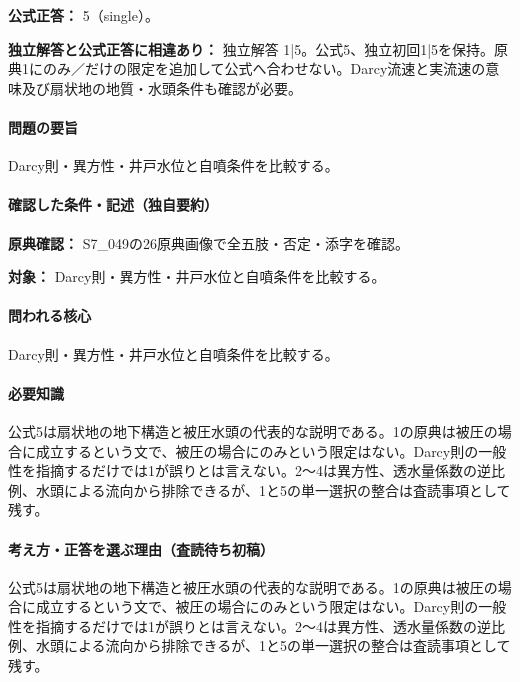 \textbf{公式正答：} 5（single）。

\par\textbf{独立解答と公式正答に相違あり：} 独立解答 1|5。公式5、独立初回1|5を保持。原典1にのみ／だけの限定を追加して公式へ合わせない。Darcy流速と実流速の意味及び扇状地の地質・水頭条件も確認が必要。

\paragraph{問題の要旨} Darcy則・異方性・井戸水位と自噴条件を比較する。

\paragraph{確認した条件・記述（独自要約）}\mbox{}\par

\noindent\textbf{原典確認：} S7\_049の26原典画像で全五肢・否定・添字を確認。\par

\noindent\textbf{対象：} Darcy則・異方性・井戸水位と自噴条件を比較する。\par

\paragraph{問われる核心} Darcy則・異方性・井戸水位と自噴条件を比較する。

\paragraph{必要知識} 公式5は扇状地の地下構造と被圧水頭の代表的な説明である。1の原典は被圧の場合に成立するという文で、被圧の場合にのみという限定はない。Darcy則の一般性を指摘するだけでは1が誤りとは言えない。2～4は異方性、透水量係数の逆比例、水頭による流向から排除できるが、1と5の単一選択の整合は査読事項として残す。

\paragraph{考え方・正答を選ぶ理由（査読待ち初稿）} 公式5は扇状地の地下構造と被圧水頭の代表的な説明である。1の原典は被圧の場合に成立するという文で、被圧の場合にのみという限定はない。Darcy則の一般性を指摘するだけでは1が誤りとは言えない。2～4は異方性、透水量係数の逆比例、水頭による流向から排除できるが、1と5の単一選択の整合は査読事項として残す。

